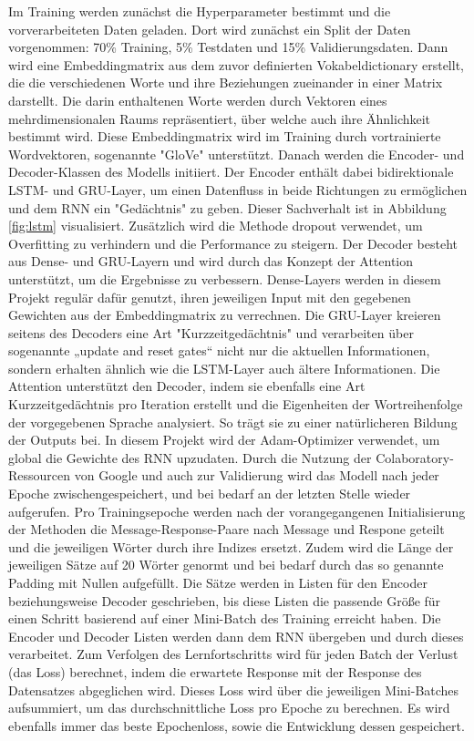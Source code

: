 \documentclass{aa}
\begin{document}
        Im Training werden zunächst die Hyperparameter bestimmt und die vorverarbeiteten Daten geladen. Dort wird zunächst ein Split der Daten vorgenommen: 70\% Training, 5\% Testdaten und 15\% Validierungsdaten. Dann wird eine Embeddingmatrix aus dem zuvor definierten Vokabeldictionary erstellt, die die verschiedenen Worte und ihre Beziehungen zueinander in einer Matrix darstellt. Die darin enthaltenen Worte werden durch Vektoren eines mehrdimensionalen Raums repräsentiert, über welche auch ihre Ähnlichkeit bestimmt wird. Diese Embeddingmatrix wird im Training durch vortrainierte Wordvektoren, sogenannte "GloVe" unterstützt.
        Danach werden die Encoder- und Decoder-Klassen des Modells initiiert. Der Encoder enthält dabei bidirektionale LSTM- und GRU-Layer, um  einen Datenfluss in beide Richtungen zu ermöglichen und dem RNN ein "Gedächtnis" zu geben. Dieser Sachverhalt ist in Abbildung \ref{fig:lstm} visualisiert. Zusätzlich wird die Methode dropout verwendet, um Overfitting zu verhindern und die Performance zu steigern.
        Der Decoder besteht aus Dense- und GRU-Layern und wird durch das Konzept der Attention unterstützt, um die Ergebnisse zu verbessern. Dense-Layers werden in diesem Projekt regulär dafür genutzt, ihren jeweiligen Input mit den gegebenen Gewichten aus der Embeddingmatrix zu verrechnen. Die GRU-Layer kreieren seitens des Decoders eine Art "Kurzzeitgedächtnis" und verarbeiten über sogenannte „update and reset gates“ nicht nur die aktuellen Informationen, sondern erhalten ähnlich wie die LSTM-Layer auch ältere Informationen. Die Attention unterstützt den Decoder, indem sie ebenfalls eine Art Kurzzeitgedächtnis pro Iteration erstellt und die Eigenheiten der Wortreihenfolge der vorgegebenen Sprache analysiert. So trägt sie zu einer natürlicheren Bildung der Outputs bei. 
        In diesem Projekt wird der Adam-Optimizer verwendet, um global die Gewichte des RNN upzudaten.
        Durch die Nutzung der Colaboratory-Ressourcen von Google und auch zur Validierung wird das Modell nach jeder Epoche zwischengespeichert, und bei bedarf an der letzten Stelle wieder aufgerufen.
        Pro Trainingsepoche werden nach der vorangegangenen Initialisierung der Methoden die Message-Response-Paare nach Message und Respone geteilt und die jeweiligen Wörter durch ihre Indizes ersetzt. Zudem wird die Länge der jeweiligen Sätze auf 20 Wörter genormt und bei bedarf durch das so genannte Padding mit Nullen aufgefüllt. Die Sätze werden in Listen für den Encoder beziehungsweise Decoder geschrieben, bis diese Listen die passende Größe für einen Schritt basierend auf einer Mini-Batch des Training erreicht haben. Die Encoder und Decoder Listen werden dann dem RNN übergeben und durch dieses verarbeitet. Zum Verfolgen des Lernfortschritts wird für jeden Batch der Verlust (das Loss) berechnet, indem die erwartete Response mit der Response des Datensatzes abgeglichen wird. Dieses Loss wird über die jeweiligen Mini-Batches aufsummiert, um das durchschnittliche Loss pro Epoche zu berechnen. Es wird ebenfalls immer das beste Epochenloss, sowie die Entwicklung dessen gespeichert. 
\end{document}
